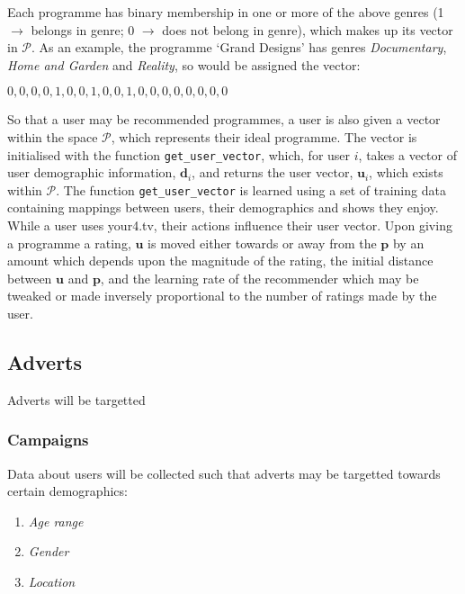 Each programme has binary membership in one or more of the above genres (1 $\rightarrow$ belongs in genre; 0 $\rightarrow$ does not belong in genre), which makes up its vector in $\mathcal{P}$. As an example, the programme `Grand Designs' has genres \emph{Documentary}, \emph{Home and Garden} and \emph{Reality}, so would be assigned the vector:
\begin{center}
	$0,0,0,0,1,0,0,1,0,0,1,0,0,0,0,0,0,0,0$
\end{center}

So that a user may be recommended programmes, a user is also given a vector within the space $\mathcal{P}$, which represents their ideal programme. The vector is initialised with the function \texttt{get\_user\_vector}, which, for user $i$, takes a vector of user demographic information, $\mathbf{d}_{i}$, and returns the user vector, $\mathbf{u}_{i}$, which exists within $\mathcal{P}$. The function \texttt{get\_user\_vector} is learned using a set of training data containing mappings between users, their demographics and shows they enjoy. While a user uses your4.tv, their actions influence their user vector. Upon giving a programme a rating, $\mathbf{u}$ is moved either towards or away from the $\mathbf{p}$ by an amount which depends upon the magnitude of the rating, the initial distance between $\mathbf{u}$ and $\mathbf{p}$, and the learning rate of the recommender which may be tweaked or made inversely proportional to the number of ratings made by the user.




\subsection{Adverts}
\label{sec:design_adverts}

Adverts will be targetted

\subsubsection{Campaigns}

Data about users will be collected such that adverts may be targetted towards certain demographics:
\begin{enumerate}
\item \textit{Age range}
\item \textit{Gender}
\item \textit{Location}
\end{enumerate}

